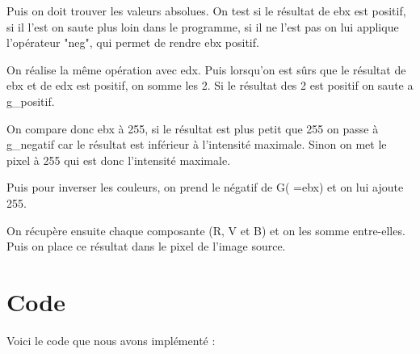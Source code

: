 \documentclass[11pt]{report}
\begin{document}
Puis on doit trouver les valeurs absolues. On test si le résultat de ebx est positif, si il l'est on saute plus loin dans le programme, si il ne l'est pas on lui applique l'opérateur "neg", qui permet de rendre ebx positif. 

On réalise la même opération avec edx. Puis lorsqu'on est sûrs que le résultat de ebx et de edx est positif, on somme les 2. Si le résultat des 2 est positif on saute a g\_positif.

On compare donc ebx à 255, si le résultat est plus petit que 255 on passe à g\_negatif car le résultat est inférieur à l'intensité maximale. Sinon on met le pixel à 255 qui est donc l'intensité maximale. 

Puis pour inverser les couleurs, on prend le négatif de G( =ebx) et on lui ajoute 255. 

On récupère ensuite chaque composante (R, V et B) et on les somme entre-elles.  Puis on place ce résultat dans le pixel de l'image source. 


\section{Code}

Voici le code que nous avons implémenté : 
\end{document}
